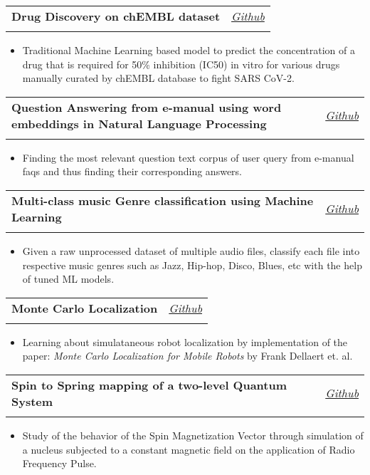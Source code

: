 \documentclass[a4paper,11pt]{article}
\makeatletter
\newcommand{\resumeProject}[4]{
\vspace{0.5mm}\item
    \begin{tabular*}{0.98\textwidth}[t]{l@{\extracolsep{\fill}}r}
        \textbf{#1} & \textit{\footnotesize{#3}} \\
        \footnotesize{\textit{#2}} & \footnotesize{#4}
    \end{tabular*}
    \vspace{-2.4mm}
}
\newcommand{\resumeItemListStart}{\begin{justify}\begin{itemize}[leftmargin=3ex, rightmargin=2ex, noitemsep,labelsep=1.2mm,itemsep=0mm]\small}
\newcommand{\resumeItemListEnd}{\end{itemize}\end{justify}\vspace{-2mm}}
\makeatother
\begin{document}
    \resumeProject
      {Drug Discovery on chEMBL dataset}{}      {\textnormal{\href{https://github.com/Nusart/drug-discovery-chembl}{Github}}}{}
      \vspace{-5.5mm}
      \resumeItemListStart
        \item {Traditional Machine Learning based model to predict the concentration of a drug that is required for 50\% inhibition (IC50) in vitro for various drugs manually curated by chEMBL database to fight SARS CoV-2.}
    \resumeItemListEnd
    
    \resumeProject
      {Question Answering from e-manual using word embeddings in Natural Language Processing}{}    {\textnormal{\href{https://github.com/Nusart/question-answering-NLP}{Github}}}{}
      \vspace{-5.5mm}
      \resumeItemListStart
        \item {Finding the most relevant question text corpus of user query from e-manual faqs and thus finding their corresponding answers.}
    \resumeItemListEnd
    
    \resumeProject
      {Multi-class music Genre classification using Machine Learning}
      {}     {\textnormal{\href{https://github.com/Nusart/music-genre-classification}{Github}}}{}
      \vspace{-5.5mm}
      \resumeItemListStart
        \item {Given a raw unprocessed dataset of multiple audio files, classify each file into respective music genres such as Jazz, Hip-hop, Disco, Blues, etc with the help of tuned ML models.}
    \resumeItemListEnd
    
    \resumeProject
      {Monte Carlo Localization}
      {}      {\textnormal{\href{https://github.com/Nusart/monte-carlo-localization}{Github}}}{}
      \vspace{-5.5mm}
      \resumeItemListStart
        \item {Learning about simulataneous robot localization by implementation of the paper: {\textit{Monte Carlo Localization for Mobile Robots}}} by Frank Dellaert et. al.
    \resumeItemListEnd
    
    \resumeProject
      {Spin to Spring mapping of a two-level Quantum System}
      {}      {\textnormal{\href{https://github.com/Nusart/spin-to-spring-mapping-of-two-level-quantum-system}{Github}}}{}
      \vspace{-5.5mm}
      \resumeItemListStart
        \item {Study of the behavior of the Spin Magnetization Vector through simulation of a nucleus subjected to a constant magnetic field on the application of Radio Frequency Pulse.}
    \resumeItemListEnd
    
\end{document}
